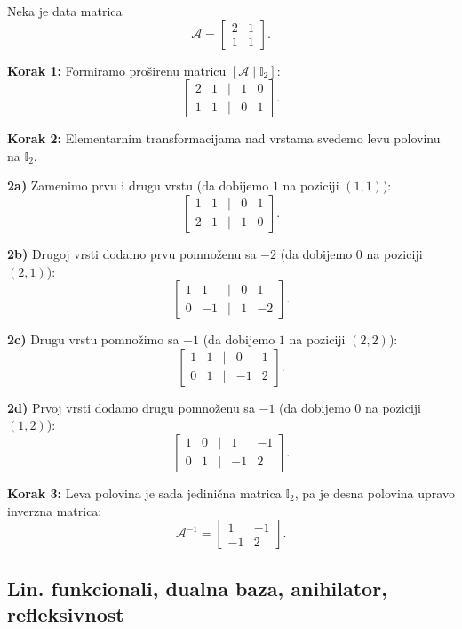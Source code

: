 \documentclass[a4paper,12pt,twoside]{report}
\numberwithin{algorithm}{section}
\begin{document}
Neka je data matrica
\[
\mathcal{A} = \begin{bmatrix} 2 & 1 \\ 1 & 1 \end{bmatrix}.
\]

\noindent
\textbf{Korak 1:} Formiramo proširenu matricu \([\mathcal{A} \mid \mathbb{I}_2]\):
\[
\begin{bmatrix}
2 & 1 & \big| & 1 & 0 \\
1 & 1 & \big| & 0 & 1
\end{bmatrix}.
\]

\medskip
\noindent
\textbf{Korak 2:} Elementarnim transformacijama nad vrstama svedemo levu polovinu na \(\mathbb{I}_2\).

\medskip
\noindent
\textbf{2a)} Zamenimo prvu i drugu vrstu (da dobijemo \(1\) na poziciji \((1,1)\)):
\[
\begin{bmatrix}
1 & 1 & \big| & 0 & 1 \\
2 & 1 & \big| & 1 & 0
\end{bmatrix}.
\]

\medskip
\noindent
\textbf{2b)} Drugoj vrsti dodamo prvu pomnoženu sa \(-2\) (da dobijemo \(0\) na poziciji \((2,1)\)):
\[
\begin{bmatrix}
1 & 1 & \big| & 0 & 1 \\
0 & -1 & \big| & 1 & -2
\end{bmatrix}.
\]

\medskip
\noindent
\textbf{2c)} Drugu vrstu pomnožimo sa \(-1\) (da dobijemo \(1\) na poziciji \((2,2)\)):
\[
\begin{bmatrix}
1 & 1 & \big| & 0 & 1 \\
0 & 1 & \big| & -1 & 2
\end{bmatrix}.
\]

\medskip
\noindent
\textbf{2d)} Prvoj vrsti dodamo drugu pomnoženu sa \(-1\) (da dobijemo \(0\) na poziciji \((1,2)\)):
\[
\begin{bmatrix}
1 & 0 & \big| & 1 & -1 \\
0 & 1 & \big| & -1 & 2
\end{bmatrix}.
\]

\medskip
\noindent
\textbf{Korak 3:} Leva polovina je sada jedinična matrica \(\mathbb{I}_2\), pa je desna polovina upravo inverzna matrica:
\[
\mathcal{A}^{-1} = \begin{bmatrix} 1 & -1 \\ -1 & 2 \end{bmatrix}.
\]

\subsection{Lin. funkcionali, dualna baza, anihilator, refleksivnost}
\end{document}
